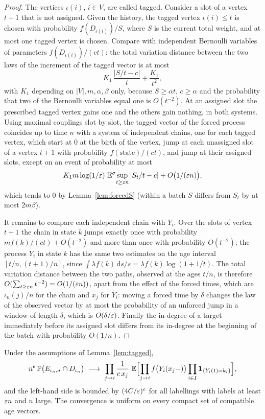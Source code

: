 \begin{proof}
The vertices $\iota(i)$, $i\in V$, are called tagged. Consider a slot of a vertex $t+1$ that is not assigned.
Given the history, the tagged vertex $\iota(i)\le t$ is chosen with probability $f(D_{\iota(i)})/S$, where $S$
is the current total weight, and at most one tagged vertex is chosen. Compare with independent Bernoulli
variables of parameters $f(D_{\iota(i)})/(ct)$: the total variation distance between the two laws of the
increment of the tagged vector is at most
\[
   K_1\,\frac{|S/t-c|}{t}+\frac{K_1}{t^2},
\]
with $K_1$ depending on $|V|,m,\alpha,\beta$ only, because $S\ge\alpha t$, $c\ge\alpha$ and the probability
that two of the Bernoulli variables equal one is $O(t^{-2})$. At an assigned slot the prescribed tagged vertex
gains one and the others gain nothing, in both systems. Using maximal couplings slot by slot, the tagged vector
of the forced process coincides up to time $n$ with a system of independent chains, one for each tagged vertex,
which start at $0$ at the birth of the vertex, jump at each unassigned slot of a vertex $t+1$ with probability
$f(\text{state})/(ct)$, and jump at their assigned slots, except on an event of probability at most
\[
   K_1m\log(1/\eps)\ \E^\sigma\!\sup_{t\ge\eps n}|S_t/t-c|+O\bigl(1/(\eps n)\bigr),
\]
which tends to $0$ by Lemma~\ref{lem:forcedS} (within a batch $S$ differs from $S_t$ by at most $2m\beta$).

It remains to compare each independent chain with $Y_i$. Over the slots of vertex $t+1$ the chain in state $k$
jumps exactly once with probability $mf(k)/(ct)+O(t^{-2})$ and more than once with probability $O(t^{-2})$;
the process $Y_i$ in state $k$ has the same two estimates on the age interval $[t/n,(t+1)/n]$, since
$\int\lambda f(k)\,\mathrm ds/s=\lambda f(k)\log(1+1/t)$. The total variation distance between the two paths,
observed at the ages $t/n$, is therefore $O(\sum_{t\ge\varepsilon n}t^{-2})=O(1/(\varepsilon n))$, apart from the effect of the
forced times, which are $\iota_n(j)/n$ for the chain and $x_j$ for $Y_i$: moving a forced time by $\delta$
changes the law of the observed vector by at most the probability of an unforced jump in a window of length
$\delta$, which is $O(\delta/\varepsilon)$. Finally the in-degree of a target immediately before its assigned slot
differs from its in-degree at the beginning of the batch with probability $O(1/n)$.
\end{proof}

\begin{proposition}\label{prop:embed}
Under the assumptions of Lemma~\ref{lem:tagged},
\[
   n^{e}\,\mathbb{P}\bigl(E_{\iota_n,\sigma}\cap D_{\iota_n}\bigr)\ \longrightarrow\
   \prod_{j\to i}\frac1{c\,x_j}\ \mathbb{E}\Bigl[\prod_{j\to i}f\bigl(Y_i(x_j-)\bigr)\prod_{i\in I}\mathbf 1_{\{Y_i(1)=k_i\}}\Bigr],
\]
and the left-hand side is bounded by $(4C/\varepsilon)^e$ for all labellings with labels at least $\varepsilon n$ and $n$
large. The convergence is uniform on every compact set of compatible age vectors.
\end{proposition}

